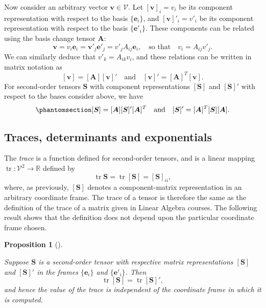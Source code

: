 \documentclass[
  letterpaper,
  DIV=11,
  numbers=noendperiod]{scrreprt}
\theoremstyle{plain}
\newtheorem{proposition}{Proposition}[chapter]
\theoremstyle{remark}
\begin{document}
Now consider an arbitrary vector \({\boldsymbol{v}}\in{\mathcal{V}}\).
Let \([{\boldsymbol{v}}]_i=v_i\) be its component representation with
respect to the basis \(\{{\boldsymbol{e}}_i\}\), and
\([{\boldsymbol{v}}]'_i = v'_i\) be its component representation with
respect to the basis \(\{{\boldsymbol{e}}'_i\}\). These components can
be related using the basis change tensor \({\boldsymbol{A}}\):
\[{\boldsymbol{v}}= v_i{\boldsymbol{e}}_i = {\boldsymbol{v}}'_j{\boldsymbol{e}}'_j  = v'_jA_{ij}{\boldsymbol{e}}_i,\quad\text{so that}\quad v_i = A_{ij}v'_j.\]
We can similarly deduce that \(v'_k = A_{ik}v_i\), and these relations
can be written in matrix notation as
\[[{\boldsymbol{v}}]= [{\boldsymbol{A}}][{\boldsymbol{v}}]' \quad\text{and}\quad[{\boldsymbol{v}}]' =[{\boldsymbol{A}}]^T[{\boldsymbol{v}}].\]
For second-order tensors \({\boldsymbol{S}}\) with component
representations \([{\boldsymbol{S}}]\) and \([{\boldsymbol{S}}]'\) with
respect to the bases consider above, we have
\begin{equation}\phantomsection\label{eq-2ordertensorchangeofbasis}{
  [{\boldsymbol{S}}] = [{\boldsymbol{A}}][{\boldsymbol{S}}]'[{\boldsymbol{A}}]^T\quad\text{and}\quad [{\boldsymbol{S}}]'=[{\boldsymbol{A}}]^T[{\boldsymbol{S}}][{\boldsymbol{A}}].
}\end{equation}

\subsection{Traces, determinants and
exponentials}\label{traces-determinants-and-exponentials}

The \emph{trace} is a function defined for second-order tensors, and is
a linear mapping \({\operatorname{tr}}:{\mathcal{V}}^2\to{\mathbb{R}}\)
defined by
\[{\operatorname{tr}}{\boldsymbol{S}}= {\operatorname{tr}}[{\boldsymbol{S}}] = [{\boldsymbol{S}}]_{ii},\]
where, as previously, \([{\boldsymbol{S}}]\) denotes a component-matrix
representation in an arbitrary coordinate frame. The trace of a tensor
is therefore the same as the definition of the trace of a matrix given
in Linear Algebra courses. The following result shows that the
definition does not depend upon the particular coordinate frame chosen.

\begin{proposition}[]\protect\hypertarget{prp-traceinvariance}{}\label{prp-traceinvariance}

Suppose \({\boldsymbol{S}}\) is a second-order tensor with respective
matrix representations \([{\boldsymbol{S}}]\) and
\([{\boldsymbol{S}}]'\) in the frames \(\{{\boldsymbol{e}}_i\}\) and
\(\{{\boldsymbol{e}}'_i\}\). Then
\[{\operatorname{tr}}[{\boldsymbol{S}}] = {\operatorname{tr}}[{\boldsymbol{S}}]',\]
and hence the value of the trace is independent of the coordinate frame
in which it is computed.

\end{proposition}
\end{document}
